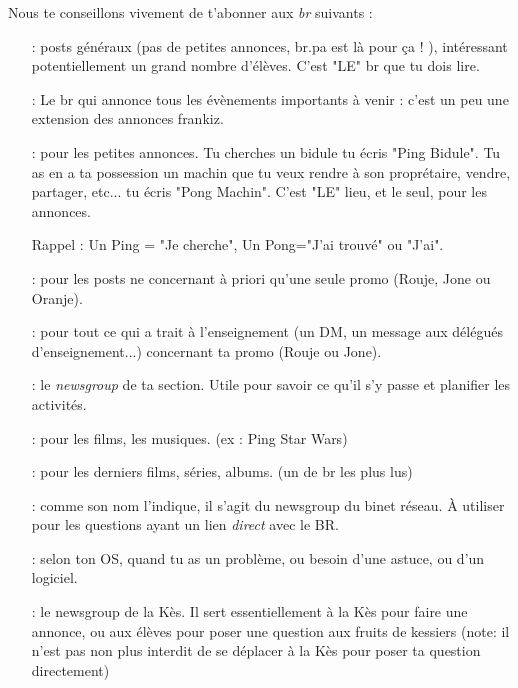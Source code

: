Nous te conseillons vivement de t'abonner aux \emph{br} suivants :
\begin{itemize}
\item[\ngname{br.eleves} :] posts généraux (pas de petites annonces, br.pa est là pour ça ! ), intéressant potentiellement un grand nombre d'élèves. C'est "LE" br que tu dois lire.

\item[\ngname{br.eleves.evenements} :] Le br qui annonce tous les évènements importants à venir : c'est un peu une extension des annonces frankiz.
	 
\item[\ngname{br.pa} :] pour les petites annonces. Tu cherches un bidule tu écris "Ping Bidule". Tu as en a ta possession un machin que tu veux rendre à son proprétaire, vendre, partager, etc... tu écris "Pong Machin". C'est "LE" lieu, et le seul, pour les annonces.

\medskip

Rappel : Un Ping = "Je cherche", Un Pong="J'ai trouvé" ou "J'ai".

\medskip


\item[\ngname{br.promo.ta\_promo} :] pour les posts ne concernant à priori qu'une seule promo (Rouje, Jone ou Oranje).
	 
 \item[\ngname{br.enseignement.*} :] pour tout ce qui a trait à l'enseignement (un DM, un message aux délégués d'enseignement...) concernant ta promo (Rouje ou Jone).
 
 \item[\ngname{br.section.ta\_section\_sportive} :] le \emph{newsgroup} de ta section.                                        Utile pour savoir ce qu'il s'y passe et planifier les activités.

\item[\ngname{br.informatique.media.request} :] pour les films, les musiques. (ex : Ping Star Wars)

\item[\ngname{br.informatique.nouveautés} :] pour les derniers films, séries, albums. (un de br les plus lus)

\item[\ngname{br.binet.br} :] comme son nom l'indique, il s'agit du newsgroup du binet réseau. À utiliser pour les questions ayant un lien \emph{direct} avec le BR.

 \item[\ngname{br.informatique.windows/linux/mac} :] selon ton OS, quand tu as un problème, ou besoin d'une astuce, ou d'un logiciel.

 \item[\ngname{br.kes} :] le newsgroup de la Kès. Il sert essentiellement à la Kès pour faire une annonce, ou aux élèves pour poser une question aux fruits de kessiers (note: il n'est pas non plus interdit de se déplacer à la Kès pour poser ta question directement)

\end{itemize}


